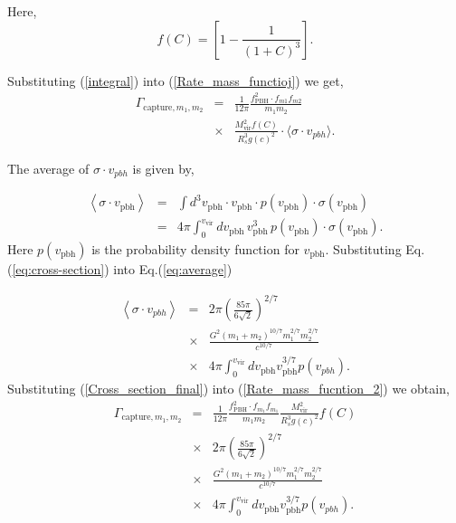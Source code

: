 \documentclass[aps, prd, reprint, nofootinbib]{revtex4-2}
\begin{document}
\begin{appendix}
Here, 
\begin{equation}
f(C)=\left[1 - \frac{1}{(1+C)^3}\right].
\end{equation}

Substituting (\ref{integral}) into (\ref{Rate_mass_functioj}) we get,
\begin{eqnarray}
\label{Rate_mass_fucntion_2}
\Gamma_{\textrm{capture}, m_1, m_2} &=& \frac{1 }{12\pi}\frac{ f_{\textrm{PBH}}^2 \cdot f_{m1} f_{m2}}{m_1 m_2}  \nonumber \\
&\times& \frac{M_{\textrm{vir}}^2 f(C)}{ R_s^3 g(c)^2}   \cdot \langle \sigma \cdot v_{pbh}\rangle.
\label{Rate_mass_fucntion_2}
\end{eqnarray}

The average of $\sigma \cdot v_{pbh}$ is given by,

\begin{eqnarray}
\left\langle\sigma \cdot v_{\textrm{pbh}}\right\rangle &=& \int d^3 v_{\textrm{pbh}}  \cdot v_{\textrm{pbh}} \cdot p(v_{\textrm{pbh}}) \cdot \sigma(v_{\textrm{pbh}}) \\
&=& 4\pi \int_0^{v_{\textrm{vir}}} dv_{\textrm{pbh}} \, v_{\textrm{pbh}}^{3} \, p(v_{\textrm{pbh}}) \cdot \sigma(v_{\textrm{pbh}}). \nonumber
\label{eq:average}
\end{eqnarray}
Here $p(v_{\textrm{pbh}})$ is the probability density function for $v_{\textrm{pbh}}$.
Substituting Eq.(\ref{eq:cross-section}) into Eq.(\ref{eq:average})

\begin{eqnarray}
\label{Cross_section_final}
\left\langle\sigma \cdot v_{pbh}\right\rangle &=& 2\pi\left(\frac{85\pi}{6\sqrt{2}}\right)^{2/7} \nonumber \\
&\times& \frac{G^2(m_1+m_2)^{10/7}m_1^{2/7}m_2^{2/7}}{c^{10/7}} \nonumber \\
&\times& 4\pi \int_0^{v_{\textrm{vir}}}dv_{\textrm{pbh}}v_{\textrm{pbh}}^{3/7}p(v_{pbh}). 
\end{eqnarray}
Substituting (\ref{Cross_section_final}) into (\ref{Rate_mass_fucntion_2}) we obtain,
\begin{eqnarray}
\Gamma_{\textrm{capture}, m_1, m_2}&=&  \frac{1 }{12\pi}\frac{ f_{\textrm{PBH}}^2 \cdot f_{m_1} f_{m_1}}{m_1 m_2} \frac{M_{\textrm{vir}}^2}{ R_s^3 g(c)^2} f(C) \nonumber \\
&\times&  2\pi\left(\frac{85\pi}{6\sqrt{2}}\right)^{2/7} \nonumber \\
&\times& \frac{G^2(m_1+m_2)^{10/7}m_1^{2/7}m_2^{2/7}}{c^{10/7}}  \nonumber \\
&\times& 4\pi \int_0^{v_{\textrm{vir}}}dv_{\textrm{pbh}}v_{\textrm{pbh}}^{3/7} p(v_{pbh}). 
\end{eqnarray}



\end{appendix}
\end{document}
